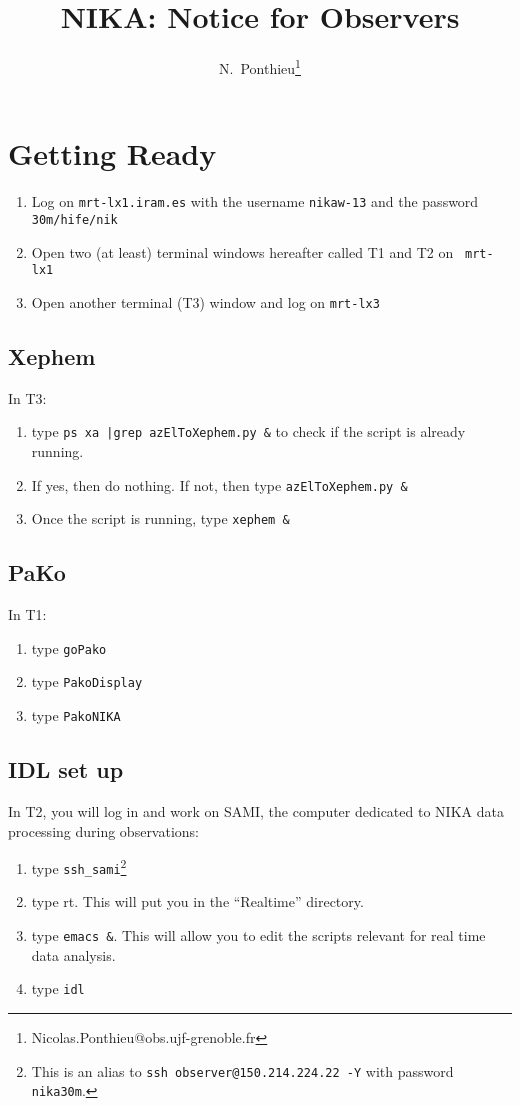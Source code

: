 \documentclass[a4paper,10pt]{article}
\title{NIKA: Notice for Observers}
\author{N.~Ponthieu\footnote{Nicolas.Ponthieu@obs.ujf-grenoble.fr}}
\begin{document}
\maketitle


\section{Getting Ready}

\begin{enumerate}
\item Log on {\tt mrt-lx1.iram.es} with the username {\tt nikaw-13} and the password
  {\tt 30m/hife/nik}
\item Open two (at least) terminal windows hereafter called T1 and T2 on {\tt
  mrt-lx1}
\item Open another terminal (T3) window and log on {\tt mrt-lx3}
\end{enumerate}

\subsection{Xephem}
In T3:
\begin{enumerate}
\item type {\tt ps xa |grep azElToXephem.py \&} to check if the script is
  already running.
\item If yes, then do nothing. If not, then type {\tt azElToXephem.py \&}
\item Once the script is running, type {\tt xephem \&}
\end{enumerate}

\subsection{PaKo}
In T1:
\begin{enumerate}
\item type {\tt goPako}
\item type {\tt PakoDisplay}
\item type {\tt PakoNIKA}
\end{enumerate}

\subsection{IDL set up}
In T2, you will log in and work on SAMI, the computer dedicated to NIKA data
processing during observations:
\begin{enumerate}
\item type {\tt ssh\_sami}\footnote{This is an alias to {\tt ssh observer@150.214.224.22 -Y} with password {\tt nika30m}.}
\item type rt. This will put you in the ``Realtime'' directory.
\item type {\tt emacs \&}. This will allow you to edit the scripts
  relevant for real time data analysis.
\item type {\tt idl}
\end{enumerate}
\end{document}
